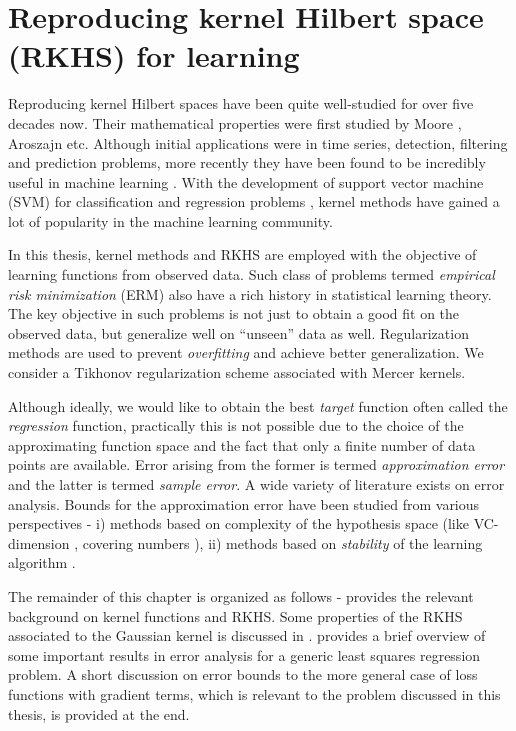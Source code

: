 \chapter{Reproducing kernel Hilbert space (RKHS) for learning}
\label{chap2a_rkhs}

Reproducing kernel Hilbert spaces have been quite well-studied for over five decades now. Their mathematical properties were first studied by Moore \cite{moo1916}, Aroszajn \cite{aro50} etc. Although initial applications were in time series, detection, filtering and prediction problems, more recently they have been found to be incredibly useful in machine learning \cite{wah90}. With the development of support vector machine (SVM) for classification and regression problems \cite{corvap95, drucburkaufsmovap97}, kernel methods have gained a lot of popularity in the machine learning community. 

In this thesis, kernel methods and RKHS are employed with the objective of learning functions from observed data. Such class of problems termed \textit{empirical risk minimization} (ERM) also have a rich history in statistical learning theory. The key objective in such problems is not just to obtain a good fit on the observed data, but generalize well on ``unseen'' data as well. Regularization methods are used to prevent \textit{overfitting} and achieve better generalization. We consider a Tikhonov regularization scheme \cite{tikars79} associated with Mercer kernels.

Although ideally, we would like to obtain the best \textit{target} function often called the \textit{regression} function, practically this is not possible due to the choice of the approximating function space and the fact that only a finite number of data points are available. Error arising from the former is termed \textit{approximation error} and the latter is termed \textit{sample error}. A wide variety of literature exists on error analysis. Bounds for the approximation error have been studied from various perspectives - i) methods based on complexity of the hypothesis space (like VC-dimension \cite{gir95}, covering numbers \cite{zhou02, smazhou03, zhou03}), ii) methods based on \textit{stability} of the learning algorithm \cite{boueli01,boueli02}.

The remainder of this chapter is organized as follows -  provides the relevant background on kernel functions and RKHS. Some properties of the RKHS associated to the Gaussian kernel is discussed in .  provides a brief overview of some important results in error analysis for a generic least squares regression problem. A short discussion on error bounds to the more general case of loss functions with gradient terms, which is relevant to the problem discussed in this thesis, is provided at the end. 

